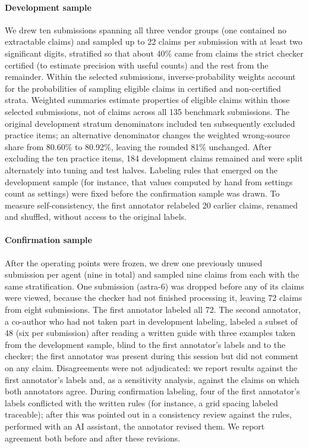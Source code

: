 \documentclass[preprint,12pt,authoryear]{elsarticle}
\begin{document}
\paragraph{Development sample} We drew ten submissions spanning all three vendor groups (one contained no extractable claims) and sampled up to 22 claims per submission with at least two significant digits, stratified so that about 40\% came from claims the strict checker certified (to estimate precision with useful counts) and the rest from the remainder. Within the selected submissions, inverse-probability weights account for the probabilities of sampling eligible claims in certified and non-certified strata. Weighted summaries estimate properties of eligible claims within those selected submissions, not of claims across all 135 benchmark submissions. The original development stratum denominators included ten subsequently excluded practice items; an alternative denominator changes the weighted wrong-source share from 80.60\% to 80.92\%, leaving the rounded 81\% unchanged. After excluding the ten practice items, 184 development claims remained and were split alternately into tuning and test halves. Labeling rules that emerged on the development sample (for instance, that values computed by hand from settings count as settings) were fixed before the confirmation sample was drawn. To measure self-consistency, the first annotator relabeled 20 earlier claims, renamed and shuffled, without access to the original labels.

\paragraph{Confirmation sample} After the operating points were frozen, we drew one previously unused submission per agent (nine in total) and sampled nine claims from each with the same stratification. One submission (astra-6) was dropped before any of its claims were viewed, because the checker had not finished processing it, leaving 72 claims from eight submissions. The first annotator labeled all 72. The second annotator, a co-author who had not taken part in development labeling, labeled a subset of 48 (six per submission) after reading a written guide with three examples taken from the development sample, blind to the first annotator's labels and to the checker; the first annotator was present during this session but did not comment on any claim. Disagreements were not adjudicated: we report results against the first annotator's labels and, as a sensitivity analysis, against the claims on which both annotators agree. During confirmation labeling, four of the first annotator's labels conflicted with the written rules (for instance, a grid spacing labeled traceable); after this was pointed out in a consistency review against the rules, performed with an AI assistant, the annotator revised them. We report agreement both before and after these revisions.
\end{document}
